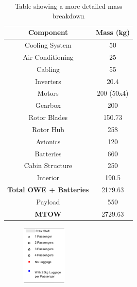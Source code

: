 \documentclass[11pt,a4paper]{article}
\begin{document}
\begin{appendices}
\renewcommand\thefigure{A.\arabic{figure}}  
\setcounter{figure}{0}

\begin{table}[H]
\centering
\caption{Table showing a more detailed mass breakdown}
\begin{tabular}{cc}
\hline
\rowcolor[HTML]{DAE8FC} 
Component                      & Mass (kg)                       \\ \hline
Cooling System                 & 50                              \\ \hline
Air Conditioning               & 25                              \\ \hline
Cabling                        & 55                              \\ \hline
Inverters                      & 20.4                            \\ \hline
Motors                         & 200 (50x4)                      \\ \hline
Gearbox                        & 200                             \\ \hline
Rotor Blades                   & 150.73                          \\ \hline
Rotor Hub                      & 258                             \\ \hline
Avionics                       & 120                             \\ \hline
Batteries                      & 660                             \\ \hline
Cabin Structure                & 250                             \\ \hline
Interior                       & 190.5                           \\ \hline
\textbf{Total OWE + Batteries} & \cellcolor[HTML]{FFCCC9}2179.63 \\ \hline
Payload                        & 550                             \\ \hline
\textbf{MTOW}                  & \cellcolor[HTML]{FFCCC9}2729.63 \\ \hline
\end{tabular}
\label{tab:massb}
\end{table}


\begin{figure}[H]
	\includegraphics[width=0.2\textwidth]{Legend.PNG}
	\label{fig:batterypos}
\end{figure}




\end{appendices}
\end{document}
